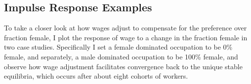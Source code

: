 \documentclass[11pt]{article}
\begin{document}

	


	



\subsection{Impulse Response Examples}
To take a closer look at how wages adjust to compensate for the preference over fraction female, I plot the response of wage to a change in the fraction female in two case studies. Specifically I set a female dominated occupation to be 0\% female, and separately, a male dominated occupation to be 100\% female, and observe how wage adjustment facilitates convergence back to the unique stable equilibria, which occurs after about eight cohorts of workers.

\end{document}
